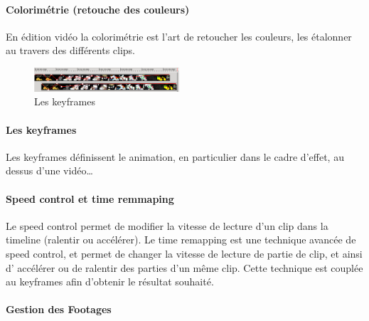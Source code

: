 \paragraph{Colorimétrie (retouche des couleurs)}

En édition vidéo la colorimétrie est l'art de retoucher les couleurs,
les étalonner au travers des différents clips.

\begin{figure}

   \vspace{-20pt}

    \begin{center}

      \includegraphics[width=0.48\textwidth]{images/keyframecurves}

    \end{center}

   \vspace{-30pt} \caption{Les keyframes} \vspace{-10pt} \label{Yes}

\end{figure}

\paragraph{Les keyframes}

Les keyframes définissent le %
animation, en particulier dans le cadre d'effet,%
au dessus d'une vidéo\ldots

\paragraph{Speed control et time remmaping}

Le speed control permet de modifier la vitesse de lecture d'un clip
dans la timeline (ralentir ou accélérer). Le time remapping est une
technique avancée de speed control, et permet de changer la vitesse de
lecture de partie de clip, et ainsi d' accélérer ou de ralentir des
parties d'un même clip. Cette technique est couplée au keyframes afin
d'obtenir le résultat souhaité.

\paragraph{Gestion des Footages}

